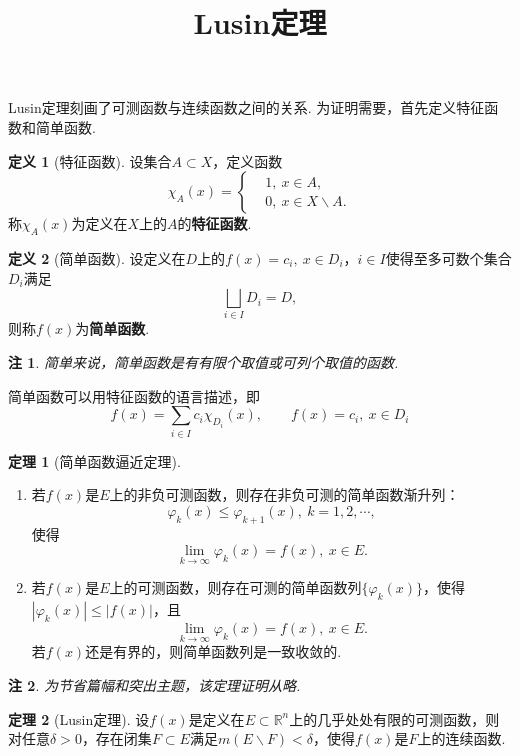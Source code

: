 \documentclass[12pt]{ctexart}
\title{\vspace{-2em}\textbf{Lusin定理}\vspace{-2em}}
\date{ }
\theoremstyle{definition}
\newtheorem{definition}{定义}
\newtheorem{theorem}{定理}
\theoremstyle{plain}
\newtheorem*{remark}{注}
\begin{document}
	\maketitle
	
	Lusin定理刻画了可测函数与连续函数之间的关系. 为证明需要，首先定义特征函数和简单函数.
	\begin{definition}[特征函数]
		设集合$A\subset X$，定义函数
		\begin{equation*}
			\chi_A(x)=\left\{\begin{aligned}
				&1,\ x\in A,\\
				&0,\ x\in X\backslash A.
			\end{aligned}\right.
		\end{equation*}
		称$\chi_A(x)$为定义在$X$上的$A$的\textbf{特征函数}.
	\end{definition}
	\begin{definition}[简单函数]
		设定义在$D$上的$f(x)=c_i,\ x\in D_i$，$i\in I$使得至多可数个集合$D_i$满足
		$$\bigsqcup_{i\in I}D_i=D,$$
		则称$f(x)$为\textbf{简单函数}.
	\end{definition}
	\begin{remark}
		简单来说，简单函数是有有限个取值或可列个取值的函数.
	\end{remark}
	简单函数可以用特征函数的语言描述，即
	$$f(x)=\sum_{i\in I}c_i\chi_{D_i}(x),\qquad f(x)=c_i,\ x\in D_i$$
	\begin{theorem}[简单函数逼近定理]
		\ 
		
		\begin{enumerate}
			\item 若$f(x)$是$E$上的非负可测函数，则存在非负可测的简单函数渐升列：
			$$\varphi_k(x)\leqslant\varphi_{k+1}(x),\ k=1,2,\cdots,$$
			使得
			$$\lim\limits_{k\to\infty}\varphi_k(x)=f(x),\ x\in E.$$
			\item 若$f(x)$是$E$上的可测函数，则存在可测的简单函数列$\{\varphi_k(x)\}$，使得$|\varphi_k(x)|\leqslant|f(x)|$，且
			$$\lim\limits_{k\to\infty}\varphi_k(x)=f(x),\ x\in E.$$
			若$f(x)$还是有界的，则简单函数列是一致收敛的.
		\end{enumerate}
	\end{theorem}
	\begin{remark}
		为节省篇幅和突出主题，该定理证明从略.
	\end{remark}
	\begin{theorem}[Lusin定理]
		设$f(x)$是定义在$E\subset\mathbb{R}^n$上的几乎处处有限的可测函数，则对任意$\delta>0$，存在闭集$F\subset E$满足$m(E\backslash F)<\delta$，使得$f(x)$是$F$上的连续函数.
	\end{theorem}
\end{document}
